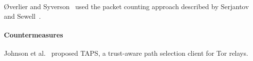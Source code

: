\O{}verlier and Syverson~\cite{Overlier2006a} used the packet counting approach
described by Serjantov and Sewell~\cite{Serjantov2003a}.

\cite{Goldberg2010a}

\cite{Juen2015a}

\paragraph{Countermeasures}
\cite{Edman2009a}
\cite{Nithyanand2016a}
\cite{Akhoondi2012a}


\cite{Mathewson2004a}
\cite{Mittal2011a}
\cite{Wacek2013a}
\cite{Johnson2013a}
\cite{Juen2015a}
\cite{Danezis2004a}
\cite{Levine2004a}
\cite{Bauer2007a}
\cite{Dingledine2009a}


Johnson et al.~\cite{Johnson2015a} proposed TAPS, a trust-aware path selection
client for Tor relays.

\cite{torstinks}
